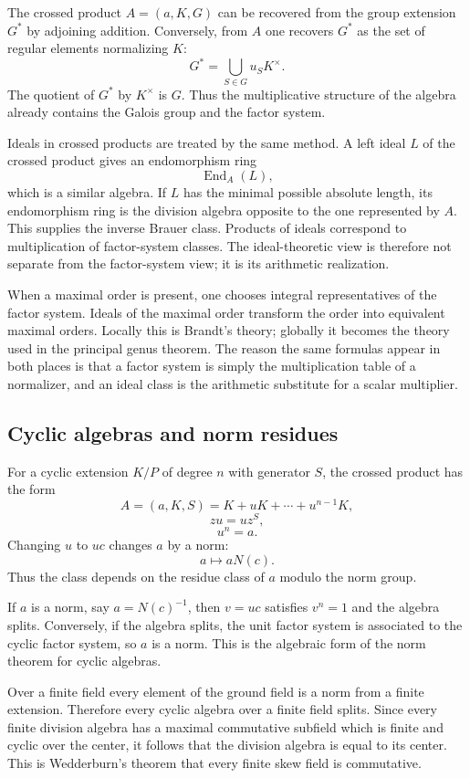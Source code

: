 \documentclass[12pt]{article}
\begin{document}
The crossed product \(A=(a,K,G)\) can be recovered from the group extension \(G^*\) by adjoining addition. Conversely, from \(A\) one recovers \(G^*\) as the set of regular elements normalizing \(K\):
\[
  G^*=\bigcup_{S\in G}u_SK^{\times}.
\]
The quotient of \(G^*\) by \(K^{\times}\) is \(G\). Thus the multiplicative structure of the algebra already contains the Galois group and the factor system.

Ideals in crossed products are treated by the same method. A left ideal \(L\) of the crossed product gives an endomorphism ring
\[
  \operatorname{End}_A(L),
\]
which is a similar algebra. If \(L\) has the minimal possible absolute length, its endomorphism ring is the division algebra opposite to the one represented by \(A\). This supplies the inverse Brauer class. Products of ideals correspond to multiplication of factor-system classes. The ideal-theoretic view is therefore not separate from the factor-system view; it is its arithmetic realization.

When a maximal order is present, one chooses integral representatives of the factor system. Ideals of the maximal order transform the order into equivalent maximal orders. Locally this is Brandt's theory; globally it becomes the theory used in the principal genus theorem. The reason the same formulas appear in both places is that a factor system is simply the multiplication table of a normalizer, and an ideal class is the arithmetic substitute for a scalar multiplier.

\subsection{Cyclic algebras and norm residues}

For a cyclic extension \(K/P\) of degree \(n\) with generator \(S\), the crossed product has the form
\[
  A=(a,K,S)=K+uK+\cdots+u^{n-1}K,
\]
\[
  zu=uz^S,
\]
\[
  u^n=a.
\]
Changing \(u\) to \(uc\) changes \(a\) by a norm:
\[
  a\mapsto aN(c).
\]
Thus the class depends on the residue class of \(a\) modulo the norm group.

If \(a\) is a norm, say \(a=N(c)^{-1}\), then \(v=uc\) satisfies \(v^n=1\) and the algebra splits. Conversely, if the algebra splits, the unit factor system is associated to the cyclic factor system, so \(a\) is a norm. This is the algebraic form of the norm theorem for cyclic algebras.

Over a finite field every element of the ground field is a norm from a finite extension. Therefore every cyclic algebra over a finite field splits. Since every finite division algebra has a maximal commutative subfield which is finite and cyclic over the center, it follows that the division algebra is equal to its center. This is Wedderburn's theorem that every finite skew field is commutative.
\end{document}
